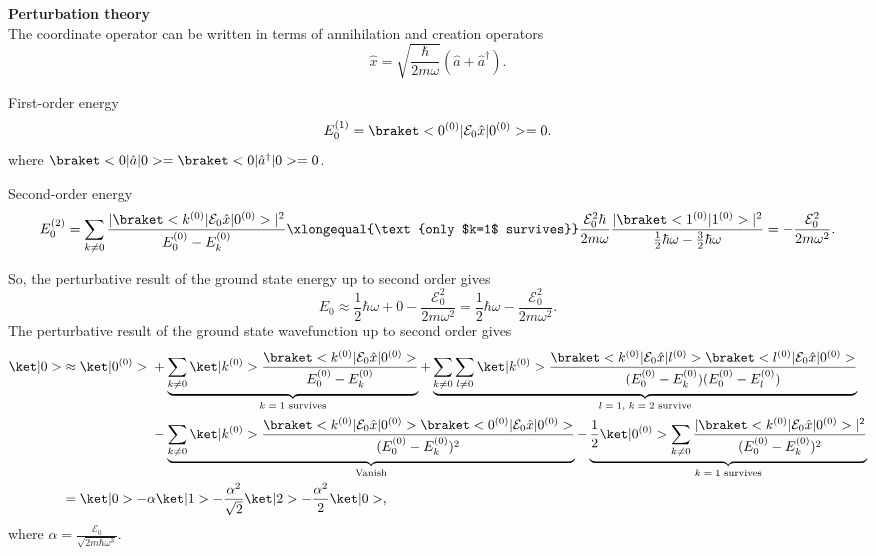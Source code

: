 \begin{solution}\leavevmode
  \begin{enumext}
    \item \textbf{Perturbation theory}\\
    The coordinate operator can be written in terms of annihilation and creation operators
    \[
      \hat x = \sqrt{\frac{\hbar}{2m\omega}} (\hat a + \hat a^\dagger).
    \]
    \begin{enumext}
      \item First-order energy
      \[
        E_0^{(1)} = \braket<0^{(0)}|\mathcal E_0 \hat x|0^{(0)}> = 0.
      \]
      where $\braket<0|\hat a|0> = \braket<0|\hat a^\dagger|0> = 0$.
      \item Second-order energy
      \[
        E_0^{(2)} = \sum_{k\neq 0} \frac{|\braket<k^{(0)}|\mathcal E_0\hat x|0^{(0)}>|^2}{E_0^{(0)} - E_k^{(0)}}
      \xlongequal{\text{only $k=1$ survives}} \frac{\mathcal E_0^2 \hbar}{2m\omega}
        \frac{|\braket<1^{(0)}|1^{(0)}>|^2}{\frac12\hbar\omega - \frac32\hbar\omega}
      = -\frac{\mathcal E_0^2}{2m\omega^2}.
      \]
    \end{enumext}
    So, the perturbative result of the ground state energy up to second order gives
    \[
      E_0 \approx \frac12\hbar\omega + 0 - \frac{\mathcal E_0^2}{2m\omega^2}
    = \frac12\hbar\omega - \frac{\mathcal E_0^2}{2m\omega^2}.
    \]
    The perturbative result of the ground state wavefunction up to second order gives
    \def \0#1#2{\braket<#1^{(0)}|\mathcal E_0\hat x|#2^{(0)}>}%
    \def \1#1#2{E_#1^{(0)} - E_#2^{(0)}}%
    \begin{alignat*}{2}
      \ket|0> & \approx \ket|0^{(0)}>
      \begin{aligned}[t]
        & + \underbrace{\sum_{k\neq 0} \ket|k^{(0)}> \frac{\0k0}{\10k}}_\text{$k = 1$ survives}
          + \underbrace{\sum_{k\neq 0}\sum_{l\neq 0} \ket|k^{(0)}> \frac{\0kl\0l0}{(\10k)(\10l)}}_\text{$l = 1$, $k = 2$ survive}\\
        & - \underbrace{\sum_{k\neq 0} \ket|k^{(0)}> \frac{\0k0\000}{(\10k)^2}}_\text{Vanish}
        - \underbrace{\frac12 \ket|0^{(0)}> \sum_{k\neq0} \frac{|\0k0|^2}{(\10k)^2}}_\text{$k = 1$ survives}\\
      \end{aligned}\\
    & = \ket|0> - \alpha\ket|1> - \frac{\alpha^2}{\sqrt2} \ket|2> - \frac{\alpha^2}{2} \ket|0>,
    \end{alignat*}
    where $\alpha = \frac{\mathcal E_0}{\sqrt{2m\hbar\omega^3}}$.\pagebreak
 

\end{enumext}
\end{solution}
